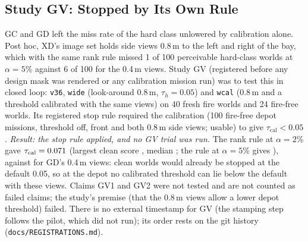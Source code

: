\documentclass[conference]{IEEEtran}
\begin{document}
\subsection{Study GV: Stopped by Its Own Rule}\label{sec:moved-gv}
GC and GD left the miss rate of the hard class unlowered by calibration alone. Post hoc, XD's image set holds side views 0.8\,m to the left and right of the bay, which with the same rank rule missed 1 of 100 perceivable hard-class worlds at $\alpha=5\%$ against 6 of 100 for the 0.4\,m views. Study GV (registered before any design mask was rendered or any calibration mission run) was to test this in closed loop: \texttt{v36}, \texttt{wide} (look-around 0.8\,m, $\tau_h=0.05$) and \texttt{wcal} (0.8\,m and a threshold calibrated with the same views) on 40 fresh fire worlds and 24 fire-free worlds. Its registered stop rule required the calibration (100 fire-free depot missions, threshold off, front and both 0.8\,m side views; \WideStopM{} usable) to give $\tau_{\mathrm{cal}}<0.05$.
\emph{Result: the stop rule applied, and no GV trial was run.} The rank rule at $\alpha=2\%$ gave $\tau_{\mathrm{cal}}=0.071$ (largest clean score \WideStopMax, median \WideStopMedian; the rule at $\alpha=5\%$ gives \WideStopFiveTau), against \WideStopNarrowTau{} for GD's 0.4\,m views: \WideStopAbove{} clean worlds would already be stopped at the default 0.05, so at the depot no calibrated threshold can lie below the default with these views. Claims GV1 and GV2 were not tested and are not counted as failed claims; the study's premise (that the 0.8\,m views allow a lower depot threshold) failed. There is no external timestamp for GV (the stamping step follows the pilot, which did not run); its order rests on the git history (\texttt{docs/REGISTRATIONS.md}).
\end{document}
